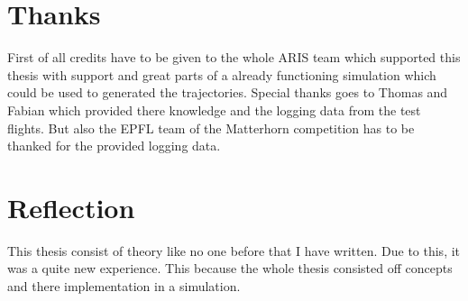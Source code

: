 \section{Thanks}
First of all credits have to be given to the whole ARIS team which supported this thesis with support
and great parts of a already functioning simulation which could be used to generated the trajectories.
Special thanks goes to Thomas and Fabian which provided there knowledge and the logging data from the test flights.
But also the EPFL team of the Matterhorn competition has to be thanked for the provided logging data.

\section{Reflection}
This thesis consist of theory like no one before that I have written.
Due to this, it was a quite new experience. 
This because the whole thesis consisted off concepts and there implementation in a simulation.
